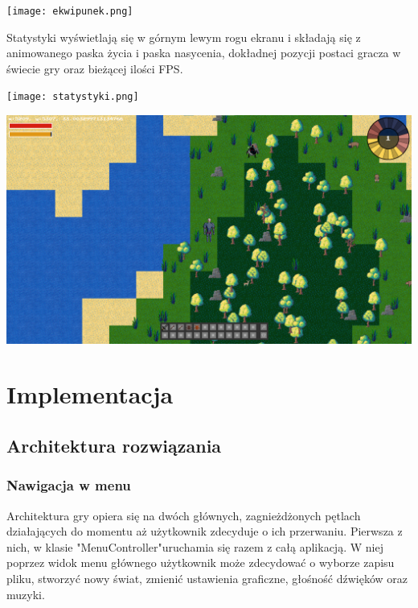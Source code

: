 \documentclass{article}
\begin{document}
\begin{center}
     \texttt{[image: ekwipunek.png]}
\end{center}

Statystyki wyświetlają się w górnym lewym rogu ekranu i składają się z animowanego paska życia i paska nasycenia, dokładnej pozycji postaci gracza w świecie gry oraz bieżącej ilości FPS\cite{wiki:fps}.

\begin{center}
     \texttt{[image: statystyki.png]}
\end{center}
\begin{center}
     \includegraphics[width=\textwidth]{graDeszcz.png}
\end{center}

\newpage
\section{Implementacja}
\subsection{Architektura rozwiązania}
\subsubsection{Nawigacja w menu}
Architektura gry opiera się na dwóch głównych, zagnieżdżonych pętlach działających do momentu aż użytkownik zdecyduje o ich przerwaniu. Pierwsza z nich, w klasie "MenuController"\space uruchamia się razem z całą aplikacją. W niej poprzez widok menu głównego użytkownik może zdecydować o wyborze zapisu pliku, stworzyć nowy świat, zmienić ustawienia graficzne, głośność dźwięków oraz muzyki.
\end{document}
